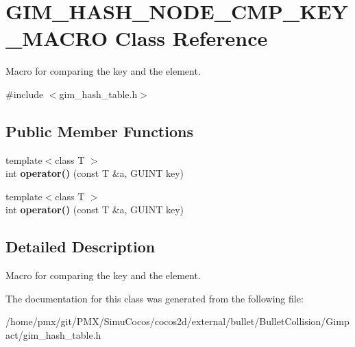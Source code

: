 \hypertarget{classGIM__HASH__NODE__CMP__KEY__MACRO}{}\section{G\+I\+M\+\_\+\+H\+A\+S\+H\+\_\+\+N\+O\+D\+E\+\_\+\+C\+M\+P\+\_\+\+K\+E\+Y\+\_\+\+M\+A\+C\+RO Class Reference}
\label{classGIM__HASH__NODE__CMP__KEY__MACRO}


Macro for comparing the key and the element.  




{\ttfamily \#include $<$gim\+\_\+hash\+\_\+table.\+h$>$}

\subsection*{Public Member Functions}
\begin{DoxyCompactItemize}
\item 
\mbox{\label{classGIM__HASH__NODE__CMP__KEY__MACRO_a1618a6e0c61c206522b4ed84b39be8e2}} 
{\footnotesize template$<$class T $>$ }\\int {\bfseries operator()} (const T \&a, G\+U\+I\+NT key)
\item 
\mbox{\label{classGIM__HASH__NODE__CMP__KEY__MACRO_a1618a6e0c61c206522b4ed84b39be8e2}} 
{\footnotesize template$<$class T $>$ }\\int {\bfseries operator()} (const T \&a, G\+U\+I\+NT key)
\end{DoxyCompactItemize}


\subsection{Detailed Description}
Macro for comparing the key and the element. 

The documentation for this class was generated from the following file\+:\begin{DoxyCompactItemize}
\item 
/home/pmx/git/\+P\+M\+X/\+Simu\+Cocos/cocos2d/external/bullet/\+Bullet\+Collision/\+Gimpact/gim\+\_\+hash\+\_\+table.\+h\end{DoxyCompactItemize}
